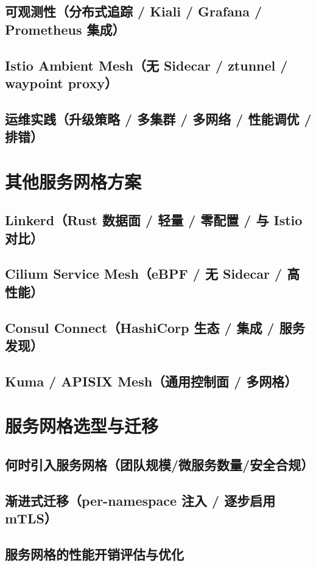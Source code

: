 \documentclass[12pt,UTF8]{ctexbook}
\begin{document}
    \subsection{可观测性（分布式追踪 / Kiali / Grafana / Prometheus 集成）}
    \subsection{Istio Ambient Mesh（无 Sidecar / ztunnel / waypoint proxy）}
    \subsection{运维实践（升级策略 / 多集群 / 多网络 / 性能调优 / 排错）}

  \section{其他服务网格方案}
    \subsection{Linkerd（Rust 数据面 / 轻量 / 零配置 / 与 Istio 对比）}
    \subsection{Cilium Service Mesh（eBPF / 无 Sidecar / 高性能）}
    \subsection{Consul Connect（HashiCorp 生态 / 集成 / 服务发现）}
    \subsection{Kuma / APISIX Mesh（通用控制面 / 多网格）}

  \section{服务网格选型与迁移}
    \subsection{何时引入服务网格（团队规模/微服务数量/安全合规）}
    \subsection{渐进式迁移（per-namespace 注入 / 逐步启用 mTLS）}
    \subsection{服务网格的性能开销评估与优化}
\end{document}
